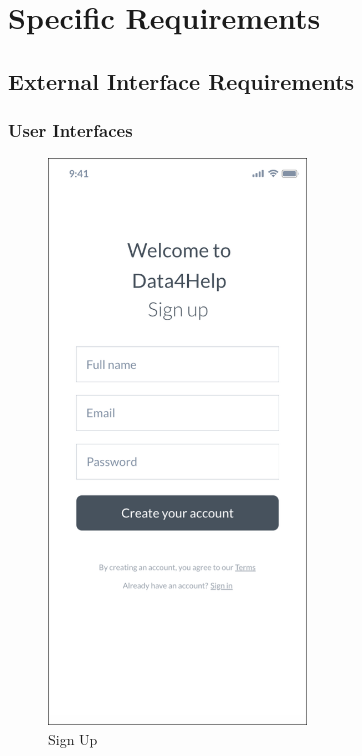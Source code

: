 \documentclass{article}
\begin{document}
\newpage
\section{Specific Requirements}

\subsection{External Interface Requirements}

	\subsubsection{User Interfaces} 	
	
	\begin{figure}[!h]
	 	\centering
		\includegraphics[height=15cm,keepaspectratio]{Figures/1SignUp}
		\caption{Sign Up}
	\end{figure}\newpage
	
\end{document}
